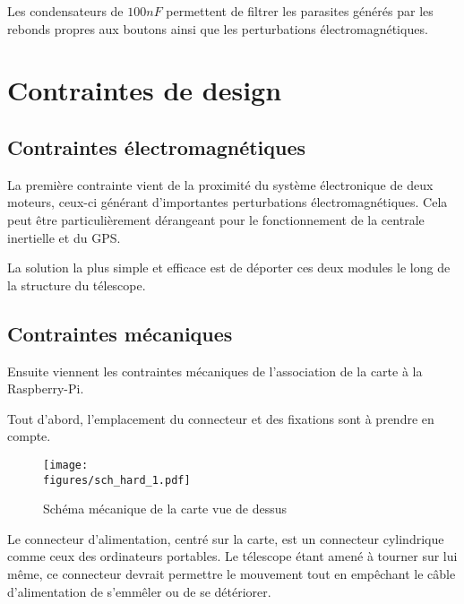 Les condensateurs de $100nF$ permettent de filtrer les parasites générés par les rebonds propres aux boutons ainsi que les perturbations électromagnétiques.

\section{Contraintes de design}

\subsection{Contraintes électromagnétiques}

La première contrainte vient de la proximité du système électronique de deux moteurs, ceux-ci générant d'importantes perturbations électromagnétiques. Cela peut être particulièrement dérangeant pour le fonctionnement de la centrale inertielle et du GPS.

La solution la plus simple et efficace est de déporter ces deux modules le long de la structure du télescope.


\subsection{Contraintes mécaniques}

Ensuite viennent les contraintes mécaniques de l'association de la carte à la Raspberry-Pi.

\vspace{1cm}

Tout d'abord, l'emplacement du connecteur et des fixations sont à prendre en compte.

\begin{figure}[H]
    \centering
    \texttt{[image: \\figures/sch\_hard\_1.pdf]}
    \decoRule
    \caption[
    Schéma mécanique de la carte vue de dessus]{
    Schéma mécanique de la carte vue de dessus}
    \label{fig:Schéma mécanique de la carte vue de dessus}
    \end{figure}

\vspace{1cm}

Le connecteur d'alimentation, centré sur la carte, est un connecteur cylindrique comme ceux des ordinateurs portables. Le télescope étant amené à tourner sur lui même, ce connecteur devrait permettre le mouvement tout en empêchant le câble d'alimentation de s'emmêler ou de se détériorer.

